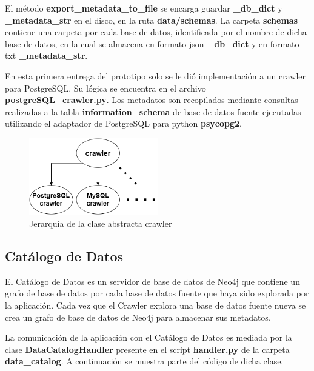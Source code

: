 El método \textbf{export\_metadata\_to\_file} se encarga guardar \textbf{\_db\_dict} y \textbf{\_metadata\_str} en el disco, 
en la ruta \textbf{data/schemas}. La carpeta \textbf{schemas} contiene una carpeta por cada base de datos, identificada 
por el nombre de dicha base de datos, en la cual se almacena en formato json \textbf{\_db\_dict} y en formato txt 
\textbf{\_metadata\_str}.

En esta primera entrega del prototipo solo se le di\'o implementación a un crawler para PostgreSQL. Su l\'ogica 
se encuentra en el archivo \textbf{postgreSQL\_crawler.py}. Los metadatos son recopilados mediante consultas realizadas
a la tabla \textbf{information\_schema} de base de datos fuente ejecutadas 
utilizando el adaptador de PostgreSQL para python \textbf{psycopg2}.

\begin{figure}[htb]
    \centering
    \includegraphics[width=0.5\textwidth]{Graphics/crawler_class.drawio.png}
    \caption{Jerarquía de la clase abstracta crawler}
    \label{fig:crawler}
\end{figure}


\subsection{Catálogo de Datos}

El Catálogo de Datos es un servidor de base de datos de Neo4j que contiene un grafo de base de datos por cada base de datos 
fuente que haya sido explorada por la aplicación. Cada vez que el Crawler explora una base de datos fuente nueva se crea 
un grafo de base de datos de Neo4j para almacenar sus metadatos.

La comunicación de la aplicación con el Catálogo de Datos es mediada por la clase \textbf{DataCatalogHandler} 
presente en el script \textbf{handler.py} de la carpeta \textbf{data\_catalog}. A continuación se muestra parte 
del código de dicha clase.

